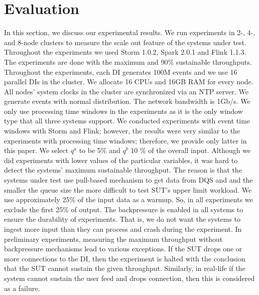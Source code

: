 
\section{Evaluation}
\label{eval}
In this section, we discuss our experimental results. We run experiments in 2-, 4-, and 8-node clusters to measure the scale out feature of the systems under test. Throughout the experiments we used Storm 1.0.2, Spark 2.0.1 and Flink 1.1.3.  The experiments are done with the maximum and 90\% sustainable throughputs. Throughout the experiments, each DI generates 100M events and we use 16 parallel DIs in the cluster. 
We allocate 16 CPUs and 16GB RAM for every node. %
All nodes' system clocks in the cluster are synchronized via an NTP server. We generate events with normal distribution. The network bandwidth is 1Gb/s. We only use processing time windows in the experiments as it is the only window type that all three systems support. We conducted experiments with event time windows with Storm and Flink; however, the results were very similar to the experiments with processing time windows; therefore, we provide only latter in this paper. 
We select $q^{a}$ to be 5\% and $q^{b}$ 10 \% of the overall input. Although we did experiments with lower values of the particular variables, it was hard to detect the systems' maximum sustainable throughput. The reason is that  the systems under test use pull-based mechanism to get data from DQS and and the smaller the queue size the more difficult to test SUT's upper limit workload.  We use approximately 25\% of the input data as a warmup. So, in all experiments we exclude the first 25\% of output. The backpressure is enabled in all systems to ensure the durability of experiments. That is, we do not want the systems to ingest more input than they can process and crash during the experiment. In preliminary experiments, measuring the maximum throughput without backpressure mechanisms lead to various exceptions. If the SUT drops one or more connections to the DI, then the experiment is halted with the conclusion that the SUT cannot sustain the given throughput. Similarly, in real-life if the system cannot sustain the user feed and drops connection, then this is considered as a failure.  


